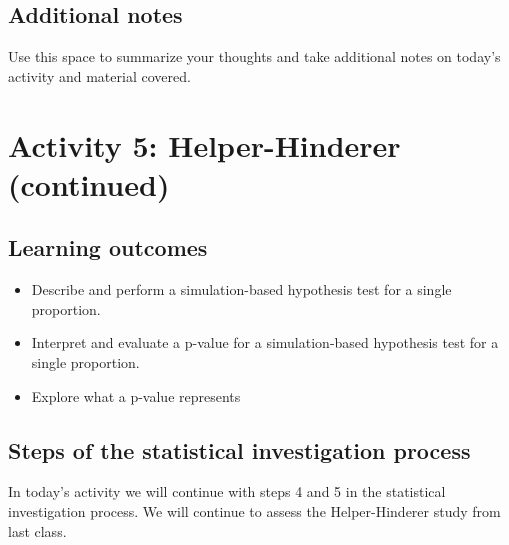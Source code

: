 \documentclass[
]{report}
\begin{document}
\subsection{Additional notes}\label{additional-notes-3}

Use this space to summarize your thoughts and take additional notes on today's activity and material covered.

\newpage

\section{Activity 5: Helper-Hinderer (continued)}\label{activity-5-helper-hinderer-continued}


\subsection{Learning outcomes}\label{learning-outcomes-4}

\begin{itemize}
\item
  Describe and perform a simulation-based hypothesis test for a single proportion.
\item
  Interpret and evaluate a p-value for a simulation-based hypothesis test for a single proportion.
\item
  Explore what a p-value represents
\end{itemize}

\subsection{Steps of the statistical investigation process}\label{steps-of-the-statistical-investigation-process-2}

In today's activity we will continue with steps 4 and 5 in the statistical investigation process. We will continue to assess the Helper-Hinderer study from last class.
\end{document}
